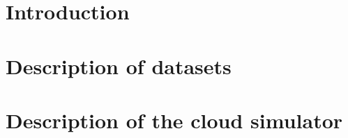 \documentclass[a4paper,11pt]{article}
\begin{document}
\title{\doctitle}
\author{\docauthor}
\date{\today}
\maketitle
\tableofcontents


\newpage
\section{Introduction}\label{sec:intro}


\newpage
\section{Description of datasets}\label{sec:datasets}


\newpage
\section{Description of the cloud simulator}\label{cld_sim}



%
%
%
%
%
%
%
%

\newpage
{}

%

\end{document}
